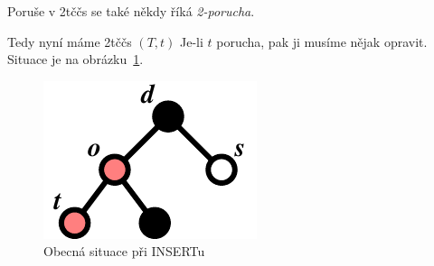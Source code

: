 \begin{pozn}
Poruše v 2tččs se také někdy říká \emph{2-porucha}.
\end{pozn}

Tedy nyní máme 2tččs $(T,t)$ Je-li $t$ porucha, pak ji musíme nějak
opravit. Situace je na obrázku~\ref{rbt-i}.

\begin{figure}[!htb]
\centering\includegraphics{pics/rbt-i}
\caption{Obecná situace při INSERTu}
\label{rbt-i}
\end{figure}

